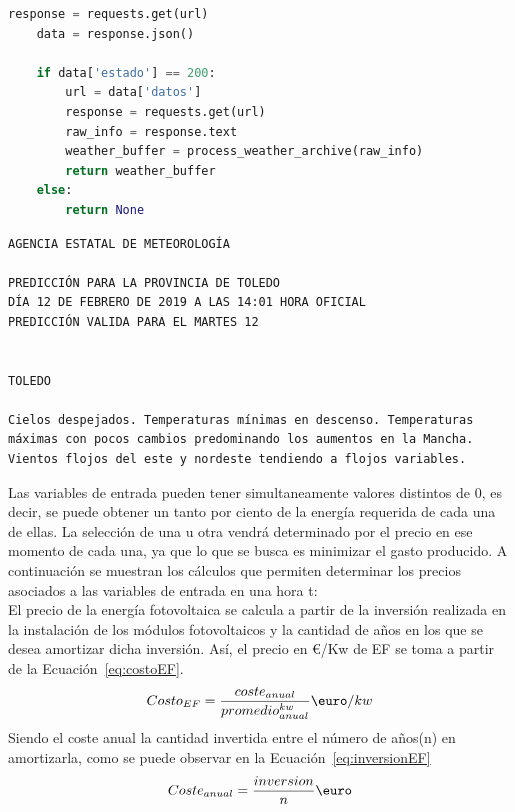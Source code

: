 \begin{itemize}
\begin{lstlisting}[language=Python,float=ht,caption={Función para obtener los valores meteorológicos de un día concreto},label={lst:aemet2}]
    response = requests.get(url)
    data = response.json()

    if data['estado'] == 200:
        url = data['datos']
        response = requests.get(url)
        raw_info = response.text
        weather_buffer = process_weather_archive(raw_info)
        return weather_buffer
    else:
        return None
\end{lstlisting}
\begin{lstlisting}[numbers=none,float=ht,caption={Ejemplo de respuesta de la API-AEMET para un día diferente al actual},label={lst:APIresponse2}]
AGENCIA ESTATAL DE METEOROLOGÍA

PREDICCIÓN PARA LA PROVINCIA DE TOLEDO
DÍA 12 DE FEBRERO DE 2019 A LAS 14:01 HORA OFICIAL
PREDICCIÓN VALIDA PARA EL MARTES 12


TOLEDO

Cielos despejados. Temperaturas mínimas en descenso. Temperaturas
máximas con pocos cambios predominando los aumentos en la Mancha.
Vientos flojos del este y nordeste tendiendo a flojos variables.
\end{lstlisting}
\end{itemize}

Las variables de entrada pueden tener simultaneamente valores distintos de 0, es decir, se puede obtener un tanto por ciento de la energía requerida de cada una de ellas. La selección de una u otra vendrá determinado por el precio en ese momento de cada una, ya que lo que se busca es minimizar el gasto producido. A continuación se muestran los cálculos que permiten determinar los precios asociados a las variables de entrada en una hora t: \\

	El precio de la energía fotovoltaica se calcula a partir de la inversión realizada en la instalación de los módulos fotovoltaicos y la cantidad de años en los que se desea amortizar dicha inversión. Así, el precio en €/Kw de EF se toma a partir de la Ecuación~\ref{eq:costoEF}.
	\begin{equation}
          \label{eq:costoEF}
	Costo_{EF} = \frac{coste_{anual}}{promedio^{kw}_{anual}} \textup{\euro}/kw
	\end{equation}
	Siendo el coste anual la cantidad invertida entre el número de años(n) en amortizarla, como se puede observar en la Ecuación~\ref{eq:inversionEF}
	\begin{equation}
          \label{eq:inversionEF}
	Coste_{anual} = \frac{inversion}{n} \textup{\euro}
	\end{equation}


